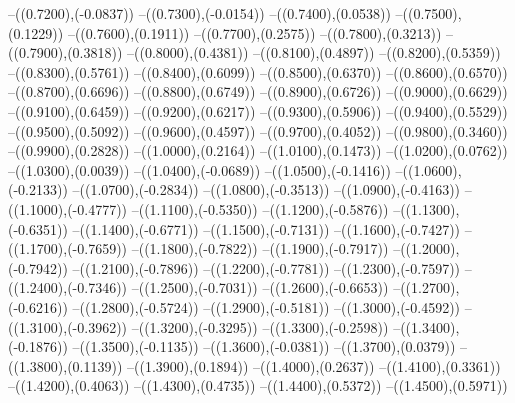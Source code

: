 {	--({\sx*(0.7200)},{\sy*(-0.0837)})
	--({\sx*(0.7300)},{\sy*(-0.0154)})
	--({\sx*(0.7400)},{\sy*(0.0538)})
	--({\sx*(0.7500)},{\sy*(0.1229)})
	--({\sx*(0.7600)},{\sy*(0.1911)})
	--({\sx*(0.7700)},{\sy*(0.2575)})
	--({\sx*(0.7800)},{\sy*(0.3213)})
	--({\sx*(0.7900)},{\sy*(0.3818)})
	--({\sx*(0.8000)},{\sy*(0.4381)})
	--({\sx*(0.8100)},{\sy*(0.4897)})
	--({\sx*(0.8200)},{\sy*(0.5359)})
	--({\sx*(0.8300)},{\sy*(0.5761)})
	--({\sx*(0.8400)},{\sy*(0.6099)})
	--({\sx*(0.8500)},{\sy*(0.6370)})
	--({\sx*(0.8600)},{\sy*(0.6570)})
	--({\sx*(0.8700)},{\sy*(0.6696)})
	--({\sx*(0.8800)},{\sy*(0.6749)})
	--({\sx*(0.8900)},{\sy*(0.6726)})
	--({\sx*(0.9000)},{\sy*(0.6629)})
	--({\sx*(0.9100)},{\sy*(0.6459)})
	--({\sx*(0.9200)},{\sy*(0.6217)})
	--({\sx*(0.9300)},{\sy*(0.5906)})
	--({\sx*(0.9400)},{\sy*(0.5529)})
	--({\sx*(0.9500)},{\sy*(0.5092)})
	--({\sx*(0.9600)},{\sy*(0.4597)})
	--({\sx*(0.9700)},{\sy*(0.4052)})
	--({\sx*(0.9800)},{\sy*(0.3460)})
	--({\sx*(0.9900)},{\sy*(0.2828)})
	--({\sx*(1.0000)},{\sy*(0.2164)})
	--({\sx*(1.0100)},{\sy*(0.1473)})
	--({\sx*(1.0200)},{\sy*(0.0762)})
	--({\sx*(1.0300)},{\sy*(0.0039)})
	--({\sx*(1.0400)},{\sy*(-0.0689)})
	--({\sx*(1.0500)},{\sy*(-0.1416)})
	--({\sx*(1.0600)},{\sy*(-0.2133)})
	--({\sx*(1.0700)},{\sy*(-0.2834)})
	--({\sx*(1.0800)},{\sy*(-0.3513)})
	--({\sx*(1.0900)},{\sy*(-0.4163)})
	--({\sx*(1.1000)},{\sy*(-0.4777)})
	--({\sx*(1.1100)},{\sy*(-0.5350)})
	--({\sx*(1.1200)},{\sy*(-0.5876)})
	--({\sx*(1.1300)},{\sy*(-0.6351)})
	--({\sx*(1.1400)},{\sy*(-0.6771)})
	--({\sx*(1.1500)},{\sy*(-0.7131)})
	--({\sx*(1.1600)},{\sy*(-0.7427)})
	--({\sx*(1.1700)},{\sy*(-0.7659)})
	--({\sx*(1.1800)},{\sy*(-0.7822)})
	--({\sx*(1.1900)},{\sy*(-0.7917)})
	--({\sx*(1.2000)},{\sy*(-0.7942)})
	--({\sx*(1.2100)},{\sy*(-0.7896)})
	--({\sx*(1.2200)},{\sy*(-0.7781)})
	--({\sx*(1.2300)},{\sy*(-0.7597)})
	--({\sx*(1.2400)},{\sy*(-0.7346)})
	--({\sx*(1.2500)},{\sy*(-0.7031)})
	--({\sx*(1.2600)},{\sy*(-0.6653)})
	--({\sx*(1.2700)},{\sy*(-0.6216)})
	--({\sx*(1.2800)},{\sy*(-0.5724)})
	--({\sx*(1.2900)},{\sy*(-0.5181)})
	--({\sx*(1.3000)},{\sy*(-0.4592)})
	--({\sx*(1.3100)},{\sy*(-0.3962)})
	--({\sx*(1.3200)},{\sy*(-0.3295)})
	--({\sx*(1.3300)},{\sy*(-0.2598)})
	--({\sx*(1.3400)},{\sy*(-0.1876)})
	--({\sx*(1.3500)},{\sy*(-0.1135)})
	--({\sx*(1.3600)},{\sy*(-0.0381)})
	--({\sx*(1.3700)},{\sy*(0.0379)})
	--({\sx*(1.3800)},{\sy*(0.1139)})
	--({\sx*(1.3900)},{\sy*(0.1894)})
	--({\sx*(1.4000)},{\sy*(0.2637)})
	--({\sx*(1.4100)},{\sy*(0.3361)})
	--({\sx*(1.4200)},{\sy*(0.4063)})
	--({\sx*(1.4300)},{\sy*(0.4735)})
	--({\sx*(1.4400)},{\sy*(0.5372)})
	--({\sx*(1.4500)},{\sy*(0.5971)})
}
